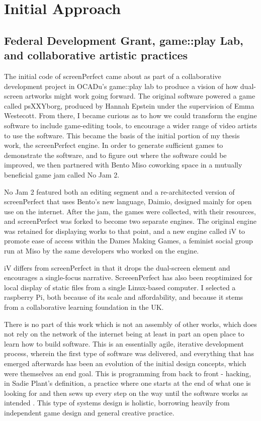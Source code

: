 \section{Initial Approach}


\subsection{Federal Development Grant, game::play Lab, and collaborative artistic practices}

The initial code of screenPerfect came about as part of a collaborative development project in OCADu's game::play lab to produce a vision of how dual-screen artworks might work going forward. The original software powered a game called psXXYborg, produced by Hannah Epstein under the supervision of Emma Westecott. From there, I became curious as to how we could transform the engine software to include game-editing tools, to encourage a wider range of video artists to use the software. This became the basis of the initial portion of my thesis work, the screenPerfect engine. In order to generate sufficient games to demonstrate the software, and to figure out where the software could be improved, we then partnered with Bento Miso coworking space in a mutually beneficial game jam called No Jam 2.

No Jam 2 featured both an editing segment and a re-architected version of screenPerfect that uses Bento's new language, Daimio, designed mainly for open use on the internet. After the jam, the games were collected, with their resources, and screenPerfect was forked to become two separate engines. The original engine was retained for displaying works to that point, and a new engine called iV to promote ease of access within the Dames Making Games, a feminist social group run at Miso by the same developers who worked on the engine. 

iV differs from screenPerfect in that it drops the dual-screen element and encourages a single-focus narrative. ScreeenPerfect has also been reoptimized for local display of static files from a single Linux-based computer. I selected a raspberry Pi, both because of its scale and affordability, and because it stems from a collaborative learning foundation in the UK.

There is no part of this work which is not an assembly of other works, which does not rely on the network of the internet being at least in part an open place to learn how to build software. This is an essentially agile, iterative development process, wherein the first type of software was delivered, and everything that has emerged afterwards has been an evolution of the initial design concepts, which were themselves an end goal. This is programming from back to front - hacking, in Sadie Plant's definition, a practice where one starts at the end of what one is looking for and then sews up every step on the way until the software works as intended \cite{plant}. This type of systems design is holistic, borrowing heavily from independent game design and general creative practice.

